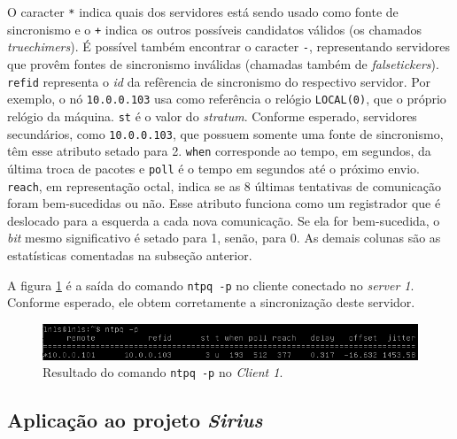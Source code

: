 \FloatBarrier

O caracter \texttt{*} indica quais dos servidores está sendo usado como fonte de
sincronismo e o \texttt{+} indica os outros possíveis candidatos válidos (os
chamados \textit {truechimers}). É possível também encontrar o caracter
\texttt{-}, representando servidores que provêm fontes de sincronismo inválidas
(chamadas também de \textit{falsetickers}). \texttt{refid} representa o
\textit{id} da refêrencia de sincronismo do respectivo servidor. Por exemplo, o
nó \texttt{10.0.0.103} usa como referência o relógio \texttt{LOCAL(0)}, que o
próprio relógio da máquina. \texttt{st} é o valor do \textit{stratum}. Conforme
esperado, servidores secundários, como \texttt{10.0.0.103}, que possuem somente
uma fonte de sincronismo, têm esse atributo setado para 2. \texttt{when}
corresponde ao tempo, em segundos, da última troca de pacotes e \texttt{poll} é
o tempo em segundos até o próximo envio. \texttt{reach}, em representação octal,
indica se as 8 últimas tentativas de comunicação foram bem-sucedidas ou não. 
Esse atributo funciona como um registrador que é deslocado para a esquerda a
cada nova comunicação. Se ela for bem-sucedida, o \textit {bit} mesmo
significativo é setado para 1, senão, para 0. As demais colunas são as
estatísticas comentadas na subseção anterior.

\vspace{12pt}

A figura \ref{fig:cl1} é a saída do comando \texttt{ntpq -p} no cliente
conectado no \textit{server 1}. Conforme esperado, ele obtem corretamente a
sincronização deste servidor.

\FloatBarrier

\begin{figure}[h]
    
    \centering
    \includegraphics[scale=0.7]{image/client1_screen}
    \caption {Resultado do comando \texttt{ntpq -p} no \textit{Client 1}.}
    \label{fig:cl1}  
\end{figure} 

\FloatBarrier
\subsection {Aplicação ao projeto \textit{Sirius}}